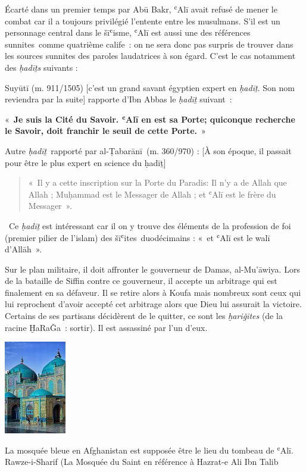 Écarté dans un premier temps par Abū Bakr, ʿAlī avait refusé de mener le
combat car il a toujours privilégié l'entente entre les musulmans. S'il
est un personnage central dans le šīʿisme, ʿAlī est aussi une des
références sunnites~comme quatrième calife~: on ne sera donc pas surpris
de trouver dans les sources sunnites des paroles laudatrices à son
égard. C'est le cas notamment des \emph{ḥadīṯs} suivants :

Suyūtī (m. 911/1505) {[}c'est un grand savant égyptien expert en
\emph{ḥadīṯ}. Son nom reviendra par la suite{]} rapporte d'Ibn Abbas le
\emph{ḥadīṯ} suivant~:

«~\textbf{Je suis la Cité du Savoir. ʿAlī en est sa Porte; quiconque
recherche le Savoir, doit franchir le seuil de cette Porte.}~»

Autre \emph{ḥadīṯ}~rapporté par al-Ṭabarānī~(m. 360/970) : {[}À son
époque, il passait pour être le plus expert en science du ḥadīṯ{]}
\begin{quote}
«~{Il y a cette inscription sur la Porte du Paradis: Il n'y a de
Allah que Allah ; Muḥammad est le Messager de Allah ; et ʿAlī est le
frère du Messager}~».~
\end{quote}


~Ce \emph{ḥadīṯ} est intéressant car il on y trouve des éléments de la
profession de foi (premier pilier de l'islam) des šīʿites~duodécimains :
«~et ʿAlī est le walī d'Allāh~».

Sur le plan militaire, il doit affronter le gouverneur de Damas,
al-Mu'āwiya. Lors de la bataille de Siffin contre ce gouverneur, il
accepte un arbitrage qui est finalement en sa défaveur. Il se retire
alors à Koufa mais nombreux sont ceux qui lui reprochent d'avoir accepté
cet arbitrage alors que Dieu lui assurait la victoire. Certains de ses
partisans décidèrent de le quitter, ce sont les \emph{ḫariǧites} (de la
racine ḪaRaǦa~: sortir). Il est assassiné par l'un d'eux.

\begin{marginfigure}
    \includegraphics[width=1.06615in,height=1.6045in]{Images/image037.jpg}
    \caption{La mosquée bleue en Afghanistan est supposée être le lieu
du tombeau de ʿAlī. Rawze-i-Sharif (La Mosquée du Saint en référence à
Hazrat-e Ali Ibn Talib}
\end{marginfigure}


